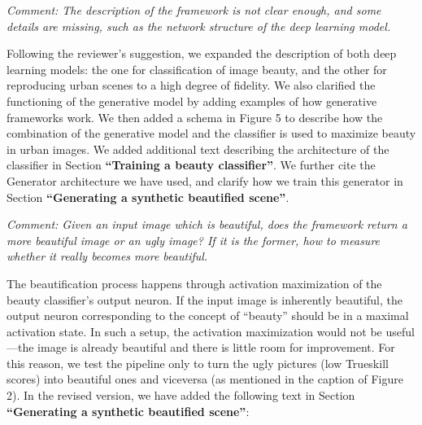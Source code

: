 \documentclass{paper}
\newenvironment{myquote}
{\definecolor{shadecolor}{rgb}{0.9,0.95,1} \begin{shaded*} \sf \em}
{\em\end{shaded*}}
\begin{document}
\begin{myquote}
\noindent Comment: The description of the framework is not clear enough, and some details are missing, such as the network structure of the deep learning model.
\end{myquote}

\noindent Following the reviewer's suggestion, we expanded the description of both deep learning models: the one for classification of image beauty, and the other for reproducing urban scenes to a high degree of fidelity. We also clarified the functioning of the generative model by adding examples of how generative frameworks work. We then added a schema in Figure 5 to describe how the combination of the generative model and the classifier is used to maximize beauty in urban images. We added additional text describing the architecture of the classifier in Section \textbf{``Training a beauty classifier''}. We further cite the Generator architecture we have used, and clarify how we train this generator in Section \textbf{``Generating a synthetic beautified scene''}.


\begin{myquote}
\noindent Comment: Given an input image which is beautiful, does the framework return a more beautiful image or an ugly image? If it is the former, how to measure whether it really becomes more beautiful. 
\end{myquote}

\noindent The beautification process happens through activation maximization of the beauty classifier's output neuron. If the input image is inherently beautiful, the output neuron corresponding to the concept of ``beauty'' should be in a maximal activation state. In such a setup, the activation maximization would not be useful---the image is already beautiful and there is little room for improvement. For this reason, we test the pipeline only to turn the ugly pictures (low Trueskill scores) into beautiful ones and viceversa (as mentioned in the caption of Figure 2).
In the revised version, we have added the following text in Section \textbf{``Generating a synthetic beautified scene''}:
\end{document}
